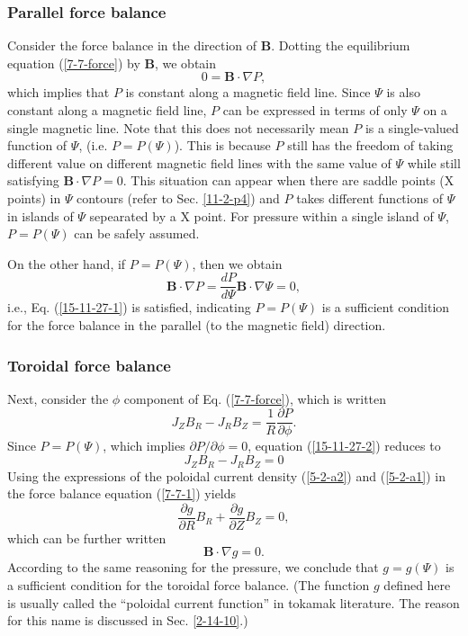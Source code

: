 \documentclass{llncs}
\begin{document}
\subsubsection{Parallel force balance }

Consider the force balance in the direction of $\mathbf{B}$. Dotting the
equilibrium equation (\ref{7-7-force}) by $\mathbf{B}$, we obtain
\begin{equation}
  \label{15-11-27-1} 0 =\mathbf{B} \cdot \nabla P,
\end{equation}
which implies that $P$ is constant along a magnetic field line. Since $\Psi$
is also constant along a magnetic field line, $P$ can be expressed in terms of
only $\Psi$ on a single magnetic line. Note that this does not necessarily
mean $P$ is a single-valued function of $\Psi$, (i.e. $P = P (\Psi)$). This is
because $P$ still has the freedom of taking different value on different
magnetic field lines with the same value of $\Psi$ while still satisfying
$\mathbf{B} \cdot \nabla P = 0$. This situation can appear when there are
saddle points (X points) in $\Psi$ contours (refer to Sec. \ref{11-2-p4}) and
$P$ takes different functions of $\Psi$ in islands of $\Psi$ sepearated by a X
point. For pressure within a single island of $\Psi$, $P = P (\Psi)$ can be
safely assumed.

On the other hand, if $P = P (\Psi)$, then we obtain
\[ \mathbf{B} \cdot \nabla P = \frac{d P}{d \Psi} \mathbf{B} \cdot \nabla \Psi
   = 0, \]
i.e., Eq. (\ref{15-11-27-1}) is satisfied, indicating $P = P (\Psi)$ is a
sufficient condition for the force balance in the parallel (to the magnetic
field) direction.

\subsubsection{Toroidal force balance}

Next, consider the $\phi$ component of Eq. (\ref{7-7-force}), which is written
\begin{equation}
  \label{15-11-27-2} J_Z B_R - J_R B_Z = \frac{1}{R} \frac{\partial
  P}{\partial \phi} .
\end{equation}
Since $P = P (\Psi)$, which implies $\partial P / \partial \phi = 0$, equation
(\ref{15-11-27-2}) reduces to
\begin{equation}
  \label{7-7-1} J_Z B_R - J_R B_Z = 0
\end{equation}
Using the expressions of the poloidal current density (\ref{5-2-a2}) and
(\ref{5-2-a1}) in the force balance equation (\ref{7-7-1}) yields
\begin{equation}
  \label{7-8-fai} \frac{\partial g}{\partial R} B_R + \frac{\partial
  g}{\partial Z} B_Z = 0,
\end{equation}
which can be further written
\begin{equation}
  \label{9-7-1} \mathbf{B} \cdot \nabla g = 0.
\end{equation}
According to the same reasoning for the pressure, we conclude that $g = g
(\Psi)$ is a sufficient condition for the toroidal force balance. (The
function $g$ defined here is usually called the ``poloidal current function''
in tokamak literature. The reason for this name is discussed in Sec.
\ref{2-14-10}.)
\end{document}
